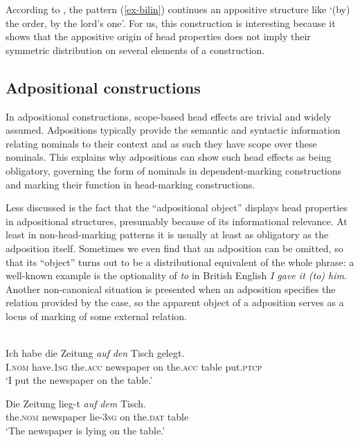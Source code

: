 \documentclass[output=paper,nobabel,draftmode  ,colorlinks, citecolor=brown]{langscibook}
\begin{document}
\largerpage[2]
\noindent
According to \citet{Aristar1995}, the pattern (\ref{ex-bilin}) continues an appositive structure like `(by) the order, by the lord's one'. For us, this construction is interesting because it shows that the appositive origin of head properties does not imply their symmetric distribution on several elements of a construction.

\subsection{Adpositional constructions}\label{subsec-adpositional}

In adpositional constructions, scope-based head effects are trivial and widely assumed. Adpositions typically provide the semantic and syntactic information relating nominals to their context and as such they have scope over these nominals. This explains why adpositions can show such head effects as being obligatory, governing the form of nominals in dependent-marking constructions and marking their function in head-marking constructions.

Less discussed is the fact that the ``adpositional object'' displays head properties in adpositional
structures, presumably because of its informational relevance. At least in non-head-marking patterns
it is usually at least as obligatory as the adposition itself. Sometimes we even find that an
adposition can be omitted, so that its ``object'' turns out to be a distributional equivalent of the
whole phrase: a well-known example is the optionality of \emph{to} in British English \emph{I gave it (to)
him}. Another non-canonical situation is presented when an adposition specifies the relation
provided by the case, so the apparent object of a adposition serves as a locus of marking of some
external relation. 

\largerpage[2]
\ea\label{ex-deutsch} 
\\
\ea
\gll Ich habe die	Zeitung \emph{auf} \emph{den} Tisch gelegt.\\ 
     I.\textsc{nom}	 have.\textsc{1sg} the.\textsc{acc}	newspaper  on the.\textsc{acc} table put.\textsc{ptcp}\\
\glt `I put the newspaper on the table.'

\ex
\gll Die Zeitung lieg-t \emph{auf} \emph{dem} Tisch.\\ the.\textsc{nom}  newspaper        lie-\textsc{3sg} on the.\textsc{dat} table\\
\glt `The newspaper is lying on the table.'
\z\z
\end{document}
